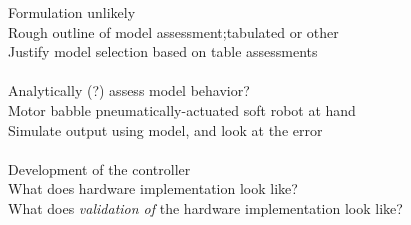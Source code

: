 Formulation unlikely\\                                  %
Rough outline of model assessment;tabulated or other\\  %
Justify model selection based on table assessments\\
\\
Analytically (?) assess model behavior?\\
Motor babble pneumatically-actuated soft robot at hand\\
Simulate output using model, and look at the error\\    %
\\
Development of the controller\\     %
What does hardware implementation look like?\\
What does \textit{validation of}    %
the hardware implementation look like?